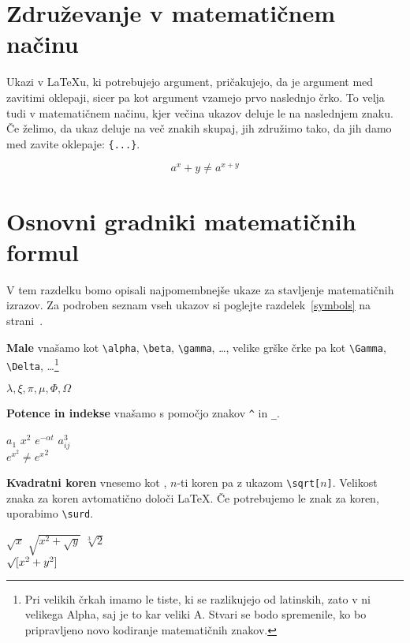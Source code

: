 \section{Združevanje v matematičnem načinu}

Ukazi v \LaTeX{}u, ki potrebujejo argument, pričakujejo, da je argument
med zavitimi oklepaji, sicer pa kot argument vzamejo prvo naslednjo črko.
To velja tudi v matematičnem načinu, kjer večina ukazov deluje le na naslednjem znaku.
Če želimo, da ukaz deluje na več znakih skupaj, jih združimo tako, da jih damo 
med zavite oklepaje: \verb|{...}|.
\begin{example}
\begin{equation}
a^x+y \neq a^{x+y}
\end{equation}
\end{example}

\section{Osnovni gradniki matematičnih formul}

V tem razdelku bomo opisali najpomembnejše ukaze za stavljenje matematičnih 
izrazov. Za podroben seznam vseh ukazov si poglejte razdelek~\ref{symbols} na 
strani~\pageref{symbols}.

\textbf{Male } vnašamo kot \verb|\alpha|,
 \verb|\beta|, \verb|\gamma|, \ldots, velike grške črke pa kot
\verb|\Gamma|, \verb|\Delta|, \ldots\footnote{Pri velikih črkah imamo le tiste, 
  ki se razlikujejo od latinskih, zato v \LaTeXe{} ni velikega Alpha, saj je to kar veliki A. 
  Stvari se bodo spremenile, ko bo pripravljeno novo kodiranje matematičnih znakov.} 
\begin{example}
$\lambda,\xi,\pi,\mu,\Phi,\Omega$
\end{example}

\textbf{Potence in indekse} vnašamo s pomočjo znakov 
\verb|^| in \verb|_|.
\begin{example}
$a_{1}$ \qquad $x^{2}$ \qquad
$e^{-\alpha t}$ \qquad
$a^{3}_{ij}$\\
$e^{x^2} \neq {e^x}^2$
\end{example}

\textbf{Kvadratni koren} vnesemo kot , $n$-ti koren 
pa z ukazom \verb|\sqrt[|$n$\verb|]|. Velikost znaka za koren avtomatično določi 
\LaTeX. Če potrebujemo le znak za koren, uporabimo \verb|\surd|.
\begin{example}
$\sqrt{x}$ \qquad 
$\sqrt{ x^{2}+\sqrt{y} }$ 
\qquad $\sqrt[3]{2}$\\[3pt]
$\surd[x^2 + y^2]$
\end{example}

